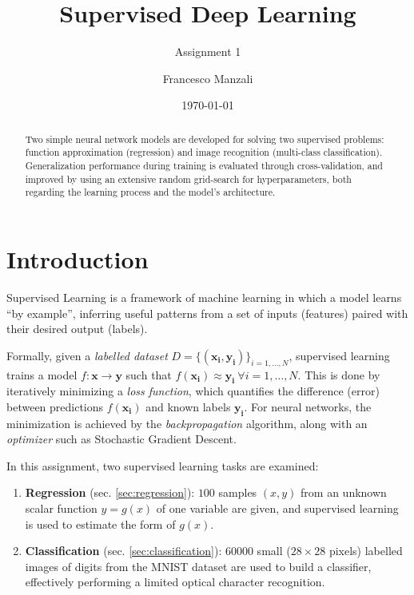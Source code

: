 \documentclass[11pt,a4paper]{scrartcl}
\newcommand{\exerciseNumber}{1}
\newcommand{\q}[1]{``#1''}
\begin{document}
\title{Supervised Deep Learning}
\subtitle{Assignment \exerciseNumber}
\author{\large Francesco Manzali}
\date{\large \today}
\maketitle
\thispagestyle{fancy}

\begin{abstract}
  Two simple neural network models are developed for solving two supervised problems: function approximation (regression) and image recognition (multi-class classification). Generalization performance during training is evaluated through cross-validation, and improved by using an extensive random grid-search for hyperparameters, both regarding the learning process and the model's architecture.
\end{abstract}



\section*{Introduction}
Supervised Learning is a framework of machine learning in which a model learns \q{by example}, inferring useful patterns from a set of inputs (features) paired with their desired output (labels).

Formally, given a \textit{labelled dataset} $D = \{(\bm{x_i}, \bm{y_i})\}_{i=1, \dots, N}$, supervised learning trains a model $f\colon \bm{x} \to  \bm{y}$ such that $f(\bm{x_i}) \approx \bm{y_i} \> \forall i = 1, \dots, N$. This is done by iteratively minimizing a \textit{loss function}, which quantifies the difference (error) between predictions $f(\bm{x_i})$ and known labels $\bm{y_i}$. For neural networks, the minimization is achieved by the \textit{backpropagation} algorithm, along with an \textit{optimizer} such as Stochastic Gradient Descent. 

\medskip

In this assignment, two supervised learning tasks are examined:
\begin{enumerate}
    \item \textbf{Regression} (sec. \ref{sec:regression}): $100$ samples $(x,y)$ from an unknown scalar function $y=g(x)$ of one variable are given, and supervised learning is used to estimate the form of $g(x)$.
    \item \textbf{Classification} (sec. \ref{sec:classification}): $\num{60000}$ small ($28 \times 28$ pixels) labelled images of digits from the MNIST dataset \cite{MNIST} are used to build a classifier, effectively performing a limited optical character recognition.
\end{enumerate}
\end{document}
